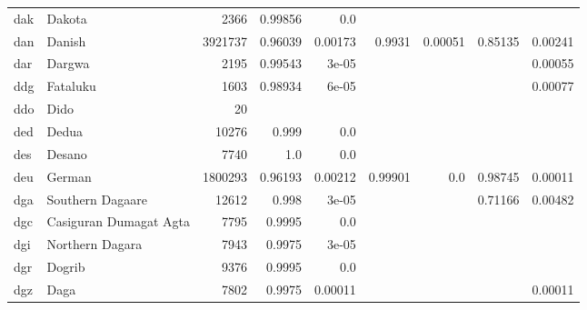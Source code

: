 \documentclass[11pt]{article}
\begin{document}
\begin{table*}[h]
{\begin{tabular}{llrrrrrrr}
dak         & Dakota         & 2366         & 0.99856         & 0.0         &          &          &          &          \\

dan         & Danish         & 3921737         & 0.96039         & 0.00173         & 0.9931         & 0.00051         & 0.85135         & 0.00241         \\

dar         & Dargwa         & 2195         & 0.99543         & 3e-05         &          &          &          & 0.00055         \\

ddg         & Fataluku         & 1603         & 0.98934         & 6e-05         &          &          &          & 0.00077         \\

ddo         & Dido         & 20         &          &          &          &          &          &          \\

ded         & Dedua         & 10276         & 0.999         & 0.0         &          &          &          &          \\

des         & Desano         & 7740         & 1.0         & 0.0         &          &          &          &          \\

deu         & German         & 1800293         & 0.96193         & 0.00212         & 0.99901         & 0.0         & 0.98745         & 0.00011         \\

dga         & Southern Dagaare         & 12612         & 0.998         & 3e-05         &          &          & 0.71166         & 0.00482         \\

dgc         & Casiguran Dumagat Agta         & 7795         & 0.9995         & 0.0         &          &          &          &          \\

dgi         & Northern Dagara         & 7943         & 0.9975         & 3e-05         &          &          &          &          \\

dgr         & Dogrib         & 9376         & 0.9995         & 0.0         &          &          &          &          \\

dgz         & Daga         & 7802         & 0.9975         & 0.00011         &          &          &          & 0.00011         \\


\end{tabular}}
\end{table*}
\end{document}
